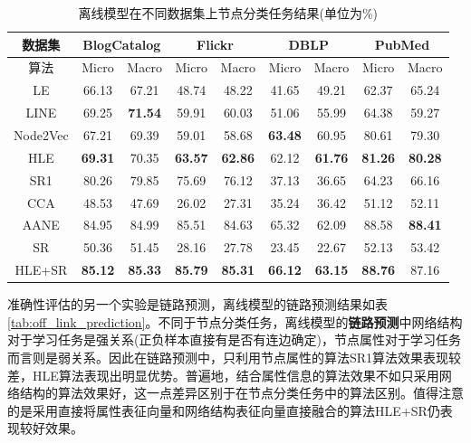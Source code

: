 \begin{table}[]
	\centering
	\caption{离线模型在不同数据集上节点分类任务结果(单位为\%)}
	\label{tab:static_node_classification}
	\begin{tabular}{|c||c|c||c|c||c|c||c|c|}
		\hline
		数据集      & \multicolumn{2}{c||}{BlogCatalog} & \multicolumn{2}{c||}{Flickr}     & \multicolumn{2}{c||}{DBLP}   & \multicolumn{2}{c|}{PubMed}     \\ \hline\hline
		算法       & Micro        & Macro       & Micro       & Macro       & Micro       & Macro       & Micro       & Macro       \\ \hline
		LE       & 66.13           & 67.21          & 48.74          & 48.22          & 41.65          & 49.21          & 62.37          & 65.24          \\ \hline
		LINE     & 69.25           & \textbf{71.54} & 59.91          & 60.03          & 51.06          & 55.99          & 64.38          & 59.27          \\ \hline
		Node2Vec & 67.21           & 69.39          & 59.01          & 58.68          & \textbf{63.48}          & 60.95 & 80.61          & 79.30          \\ \hline
		HLE      & \textbf{69.31}  & 70.35          & \textbf{63.57} & \textbf{62.86} & 62.12 & \textbf{61.76}          & \textbf{81.26} & \textbf{80.28} \\ \hline\hline
		SR1      & 80.26           & 79.85          & 75.69          & 76.12          & 37.13          & 36.65          & 64.23          & 66.16          \\ \hline\hline
		CCA      & 48.53           & 47.69          & 26.02          & 27.31          & 35.24          & 36.42          & 51.12          & 52.11          \\ \hline
		AANE     & 84.95           & 84.99          & 85.51          & 84.63 & 65.32          & 62.09          & 88.58          & \textbf{88.41} \\ \hline
		SR       & 50.36           & 51.45          & 28.16          & 27.78          & 23.45          & 22.67          & 52.13          & 53.42          \\ \hline
		HLE+SR   & \textbf{85.12}  & \textbf{85.33} & \textbf{85.79} & \textbf{85.31}          & \textbf{66.12} & \textbf{63.15} & \textbf{88.76} & 87.16          \\ \hline
	\end{tabular}
\end{table}

准确性评估的另一个实验是链路预测，离线模型的链路预测结果如表\ref{tab:off_link_prediction}。不同于节点分类任务，离线模型的\textbf{链路预测}中网络结构对于学习任务是强关系(正负样本直接有是否有连边确定)，节点属性对于学习任务而言则是弱关系。因此在链路预测中，只利用节点属性的算法SR1算法效果表现较差，HLE算法表现出明显优势。普遍地，结合属性信息的算法效果不如只采用网络结构的算法效果好，这一点差异区别于在节点分类任务中的算法区别。值得注意的是采用直接将属性表征向量和网络结构表征向量直接融合的算法HLE+SR仍表现较好效果。

